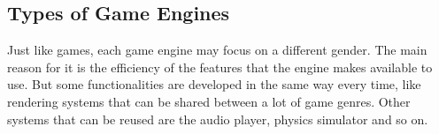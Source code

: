\subsection{Types of Game Engines}
Just like games, each game engine may focus on a different gender. The main reason for it is the efficiency of the features that the engine makes available to use. But some functionalities are developed in the same way every time, like rendering systems that can be shared between a lot of game genres. Other systems that can be reused are the audio player, physics simulator and so on.







